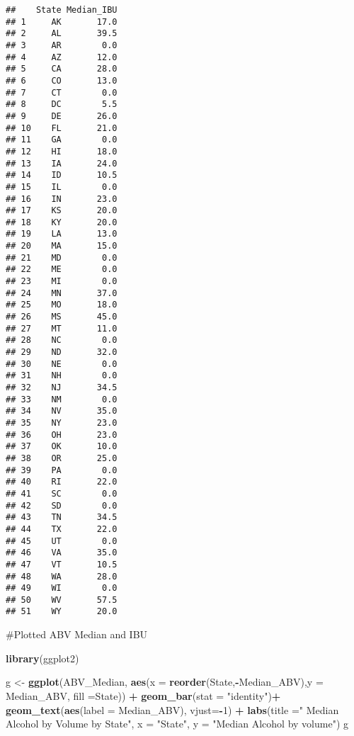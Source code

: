 \documentclass[
]{article}
\newenvironment{Shaded}{\begin{snugshade}}{\end{snugshade}}
\newcommand{\DataTypeTok}[1]{\textcolor[rgb]{0.13,0.29,0.53}{#1}}
\newcommand{\DecValTok}[1]{\textcolor[rgb]{0.00,0.00,0.81}{#1}}
\newcommand{\KeywordTok}[1]{\textcolor[rgb]{0.13,0.29,0.53}{\textbf{#1}}}
\newcommand{\NormalTok}[1]{#1}
\newcommand{\OperatorTok}[1]{\textcolor[rgb]{0.81,0.36,0.00}{\textbf{#1}}}
\newcommand{\StringTok}[1]{\textcolor[rgb]{0.31,0.60,0.02}{#1}}
\begin{document}
\begin{verbatim}
##    State Median_IBU
## 1     AK       17.0
## 2     AL       39.5
## 3     AR        0.0
## 4     AZ       12.0
## 5     CA       28.0
## 6     CO       13.0
## 7     CT        0.0
## 8     DC        5.5
## 9     DE       26.0
## 10    FL       21.0
## 11    GA        0.0
## 12    HI       18.0
## 13    IA       24.0
## 14    ID       10.5
## 15    IL        0.0
## 16    IN       23.0
## 17    KS       20.0
## 18    KY       20.0
## 19    LA       13.0
## 20    MA       15.0
## 21    MD        0.0
## 22    ME        0.0
## 23    MI        0.0
## 24    MN       37.0
## 25    MO       18.0
## 26    MS       45.0
## 27    MT       11.0
## 28    NC        0.0
## 29    ND       32.0
## 30    NE        0.0
## 31    NH        0.0
## 32    NJ       34.5
## 33    NM        0.0
## 34    NV       35.0
## 35    NY       23.0
## 36    OH       23.0
## 37    OK       10.0
## 38    OR       25.0
## 39    PA        0.0
## 40    RI       22.0
## 41    SC        0.0
## 42    SD        0.0
## 43    TN       34.5
## 44    TX       22.0
## 45    UT        0.0
## 46    VA       35.0
## 47    VT       10.5
## 48    WA       28.0
## 49    WI        0.0
## 50    WV       57.5
## 51    WY       20.0
\end{verbatim}

\#Plotted ABV Median and IBU

\begin{Shaded}
\begin{Highlighting}[]
\KeywordTok{library}\NormalTok{(ggplot2)}

\NormalTok{g <-}\StringTok{ }\KeywordTok{ggplot}\NormalTok{(ABV_Median, }\KeywordTok{aes}\NormalTok{(}\DataTypeTok{x =} \KeywordTok{reorder}\NormalTok{(State,}\OperatorTok{-}\NormalTok{Median_ABV),}\DataTypeTok{y =}\NormalTok{ Median_ABV, }\DataTypeTok{fill =}\NormalTok{State)) }\OperatorTok{+}\StringTok{ }\KeywordTok{geom_bar}\NormalTok{(}\DataTypeTok{stat =} \StringTok{"identity"}\NormalTok{)}\OperatorTok{+}\StringTok{ }\KeywordTok{geom_text}\NormalTok{(}\KeywordTok{aes}\NormalTok{(}\DataTypeTok{label =}\NormalTok{ Median_ABV), }\DataTypeTok{vjust=}\OperatorTok{-}\DecValTok{1}\NormalTok{) }\OperatorTok{+}\StringTok{ }\KeywordTok{labs}\NormalTok{(}\DataTypeTok{title =}\StringTok{" Median Alcohol by Volume by State"}\NormalTok{, }\DataTypeTok{x =} \StringTok{"State"}\NormalTok{, }\DataTypeTok{y =} \StringTok{"Median Alcohol by volume"}\NormalTok{)}
\NormalTok{g}
\end{Highlighting}
\end{Shaded}
\end{document}
